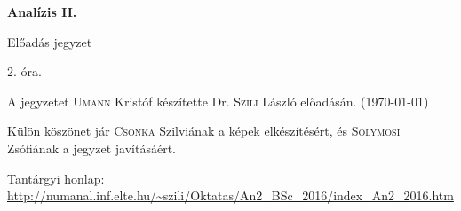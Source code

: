 \documentclass[a4paper,11.5pt]{article}
\begin{document}
	\setlength\parindent{0pt}
	\def\s{\hspace{0.2mm}\vphantom{\beta}}
	\def\Z{\mathbb{Z}}
	\def\Q{\mathbb{Q}}
	\def\R{\mathbb{R}}
	\def\C{\mathbb{C}}
	\def\N{\mathbb{N}}
	\def\Ra{\overline{\mathbb{R}}}
	
	\def\sume{\displaystyle\sum_{n=1}^{+\infty}}
	\def\sumn{\displaystyle\sum_{n=0}^{+\infty}}
	
	\def\narrow{\underset{n\rightarrow+\infty}{\longrightarrow}}
	\def\limn{\displaystyle\lim_{n\to +\infty}}
	\def\limx{\displaystyle\lim_{x\to +\infty}}
	
	\theoremstyle{definition}
	\newtheorem{theorem}{Tétel}[subsection] 
	
	\theoremstyle{definition}
	\newtheorem{definition}[theorem]{Definíció} 
	\newtheorem{example}[theorem]{Példa} 
	\newtheorem{task}[theorem]{Feladat} 
	\newtheorem{note}[theorem]{Megjegyzés}
	\newtheorem{revision}[theorem]{Emlékeztető}
	\begin{center}
		{\LARGE\textbf{Analízis II.}}
		
		{\Large Előadás jegyzet}
		
		2. óra.
	\end{center}
	A jegyzetet \textsc{Umann} Kristóf készítette Dr. \textsc{Szili} László  előadásán. (\today)
	
	Külön köszönet jár \textsc{Csonka} Szilviának a képek elkészítésért, és \textsc{Solymosi} Zsófiának a jegyzet javításáért.
	\bigskip
	
	Tantárgyi honlap: \url{http://numanal.inf.elte.hu/~szili/Oktatas/An2_BSc_2016/index_An2_2016.htm}
	
\end{document}

